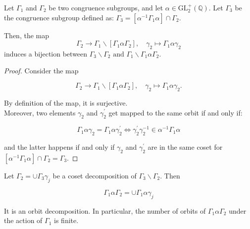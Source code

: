 \begin{proposition}
    Let $\Gamma_{1}$ and $\Gamma_{2}$ be two congruence subgroups, and let $\alpha \in \mathrm{GL}_{2}^{+}(\mathbb{Q})$. Let $\Gamma_{3}$ be the congruence subgroup defined as:
$
\Gamma_{3}=\left[\alpha^{-1} \Gamma_{1} \alpha\right] \cap \Gamma_{2}.
$

Then, the map $$
\Gamma_{2} \rightarrow \Gamma_{1} \backslash\left[\Gamma_{1} \alpha \Gamma_{2}\right], \quad \gamma_{2} \mapsto \Gamma_{1} \alpha \gamma_{2} 
$$ induces a bijection between $\Gamma_{3} \backslash \Gamma_{2}  
 \text{ and }\Gamma_{1} \backslash \Gamma_{1} \alpha \Gamma_{2}.$
\begin{proof}
    Consider the map

$$
\Gamma_{2} \rightarrow \Gamma_{1} \backslash\left[\Gamma_{1} \alpha \Gamma_{2}\right], \quad \gamma_{2} \mapsto \Gamma_{1} \alpha \gamma_{2} .
$$

By definition of the map, it is surjective. \\Moreover, two elements $\gamma_{2}$ and $\gamma_{2}^{\prime}$ get mapped to the same orbit if and only if:

$$
\Gamma_{1} \alpha \gamma_{2}=\Gamma_{1} \alpha \gamma_{2}^{\prime} \Longleftrightarrow \gamma_{2}^{\prime} \gamma_{2}^{-1} \in \alpha^{-1} \Gamma_{1} \alpha
$$

and the latter happens if and only if $\gamma_{2}$ and $\gamma_{2}^{\prime}$ are in the same coset for $\left[\alpha^{-1} \Gamma_{1} \alpha\right] \cap \Gamma_{2}=\Gamma_{3}$.

\end{proof}
\end{proposition}
\begin{corollary}
    Let $\Gamma_{2}=\cup \Gamma_{3} \gamma_{j}$ be a coset decomposition of $\Gamma_{3} \backslash \Gamma_{2}$. Then

$$
\Gamma_{1} \alpha \Gamma_{2}=\cup \Gamma_{1} \alpha \gamma_{j}
$$

It is an orbit decomposition. In particular, the number of orbits of $\Gamma_{1} \alpha \Gamma_{2}$ under the action of $\Gamma_{1}$ is finite.
\end{corollary}

